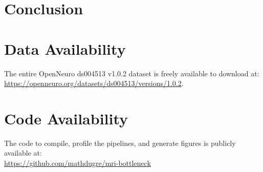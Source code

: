 \documentclass[conference]{IEEEtran}
\begin{document}
					
					
					
					
					
					
\section{Conclusion}
					
\section{Data Availability}
\label{sec:data-availability}
The entire OpenNeuro ds004513 v1.0.2 dataset is freely available to download at:
\\\href{https://openneuro.org/datasets/ds004513/versions/1.0.2}{https://openneuro.org/datasets/ds004513/versions/1.0.2}.
					
\section{Code Availability}
\label{sec:code-availability}
The code to compile, profile the pipelines, and generate figures is publicly available at:
\\\href{https://github.com/mathdugre/mri-bottleneck}{https://github.com/mathdugre/mri-bottleneck}
					
\end{document}
